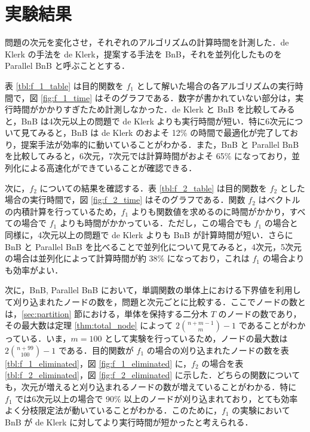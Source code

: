 \documentclass[a4paper,11pt]{jreport}
\begin{document}
\section{実験結果}

問題の次元を変化させ，それぞれのアルゴリズムの計算時間を計測した．de Klerk の手法を de Klerk，提案する手法を BnB，それを並列化したものを Parallel BnB と呼ぶこととする．\par
表 \ref{tbl:f_1_table} は目的関数を $ f_1 $ として解いた場合の各アルゴリズムの実行時間で，図 \ref{fig:f_1_time} はそのグラフである．数字が書かれていない部分は，実行時間がかかりすぎたため計測しなかった．de Klerk と BnB を比較してみると，BnB は4次元以上の問題で de Klerk よりも実行時間が短い．特に6次元について見てみると，BnB は de Klerk のおよそ 12\% の時間で最適化が完了しており，提案手法が効率的に動いていることがわかる．また，BnB と Parallel BnB を比較してみると，6次元，7次元では計算時間がおよそ 65\% になっており，並列化による高速化ができていることが確認できる．\par
次に，$ f_2 $ についての結果を確認する．表 \ref{tbl:f_2_table} は目的関数を $ f_2 $ とした場合の実行時間で，図 \ref{fig:f_2_time} はそのグラフである．関数 $ f_2 $ はベクトルの内積計算を行っているため，$ f_1 $ よりも関数値を求めるのに時間がかかり，すべての場合で $ f_1 $ よりも時間がかかっている．ただし，この場合でも $ f_1 $ の場合と同様に，4次元以上の問題で de Klerk よりも BnB が計算時間が短い．さらに BnB と Parallel BnB を比べることで並列化について見てみると，4次元，5次元の場合は並列化によって計算時間が約 38\% になっており，これは $ f_1 $ の場合よりも効率がよい．\par
次に，BnB, Parallel BnB において，単調関数の単体上における下界値を利用して刈り込まれたノードの数を，問題と次元ごとに比較する．ここでノードの数とは，\ref{sec:partition} 節における，単体を保持する二分木 $ T $ のノードの数であり，その最大数は定理 \ref{thm:total_node} によって $ 2 \binom{n + m - 1}{m} - 1 $ であることがわかっている．いま，$ m = 100 $ として実験を行っているため，ノードの最大数は $ 2 \binom{n + 99}{100} - 1 $ である．目的関数が $ f_1 $ の場合の刈り込まれたノードの数を表 \ref{tbl:f_1_eliminated}，図 \ref{fig:f_1_eliminated} に，$ f_2 $ の場合を表 \ref{tbl:f_2_eliminated}，図 \ref{fig:f_2_eliminated} に示した．どちらの関数についても，次元が増えると刈り込まれるノードの数が増えていることがわかる．特に $ f_1 $ では6次元以上の場合で 90\% 以上のノードが刈り込まれており，とても効率よく分枝限定法が動いていることがわかる．このために，$ f_1 $ の実験において BnB が de Klerk に対してより実行時間が短かったと考えられる．\par
\end{document}
